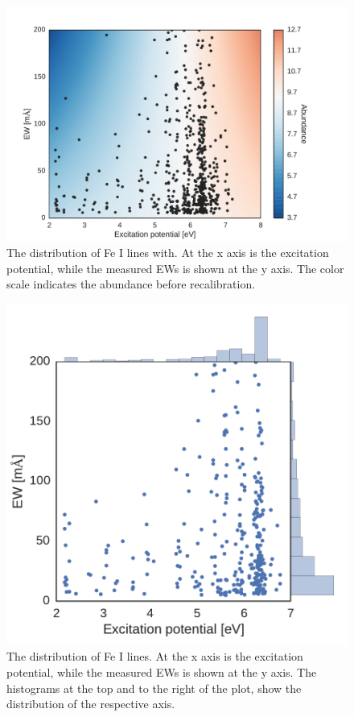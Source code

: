 \documentclass{aa}
\begin{document}
\begin{figure}[tpb]
    \centering
    \includegraphics[width=0.9\linewidth]{figures/EWvsEP.pdf}
    \caption{The distribution of Fe I lines with. At the x axis is the
    excitation potential, while the measured EWs is shown at the y axis. The
    color scale indicates the abundance before recalibration.}
    \label{fig:Fe1_before_recal}
\end{figure}


\begin{figure}[tpb]
    \centering
    \includegraphics[width=0.9\linewidth]{figures/EWvsEP_cut.pdf}
    \caption{The distribution of Fe I lines. At the x axis is the
    excitation potential, while the measured EWs is shown at the y axis.
    The histograms at the top and to the right of the plot, show the
    distribution of the respective axis.}
    \label{fig:Fe1_after_recal}
\end{figure}
\end{document}
